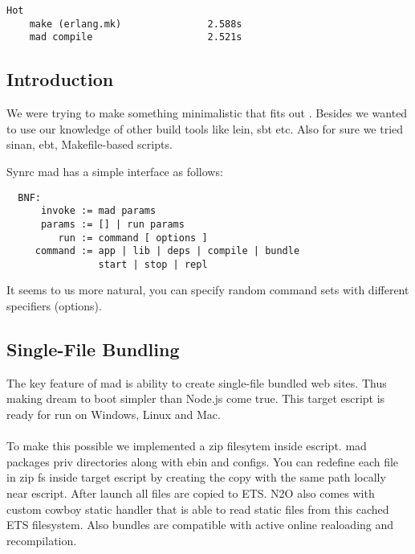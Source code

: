\vspace{1\baselineskip}
\begin{lstlisting}[caption=Example of building Cowboy]
                                   Hot
    make (erlang.mk)               2.588s
    mad compile                    2.521s
\end{lstlisting}
\vspace{1\baselineskip}

\subsection{Introduction}

We were trying to make something minimalistic that fits out .
Besides we wanted to use our knowledge of other build tools like lein, sbt etc.
Also for sure we tried sinan, ebt, Makefile-based scripts.

Synrc mad has a simple interface as follows:

\vspace{1\baselineskip}
\begin{lstlisting}
  BNF:
      invoke := mad params
      params := [] | run params
         run := command [ options ]
     command := app | lib | deps | compile | bundle
                start | stop | repl
\end{lstlisting}
\vspace{1\baselineskip}

It seems to us more natural, you can specify random
command sets with different specifiers (options).

\subsection{Single-File Bundling}

The key feature of mad is ability to create single-file bundled web sites.
Thus making dream to boot simpler than Node.js come true.
This target escript is ready for run on Windows, Linux and Mac.

\paragraph{}
To make this possible we implemented a zip filesytem inside escript.
mad packages priv directories along with ebin and configs.
You can redefine each file in zip fs inside target
escript by creating the copy with the same path locally near escript.
After launch all files are copied to ETS.
N2O also comes with custom cowboy static handler that is able to
read static files from this cached ETS filesystem.
Also bundles are compatible with active online realoading and recompilation.

